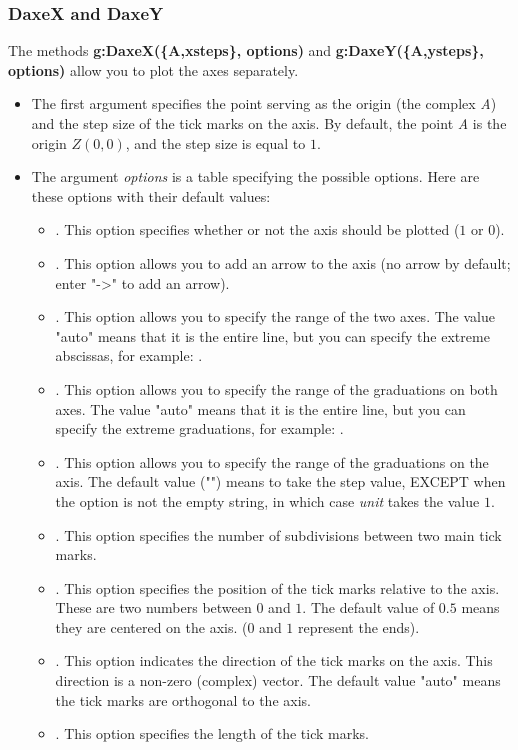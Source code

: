 \subsubsection{DaxeX and DaxeY}

The methods \textbf{g:DaxeX(\{A,xsteps\}, options)} and \textbf{g:DaxeY(\{A,ysteps\}, options)} allow you to plot the axes separately.
\begin{itemize}
    \item The first argument specifies the point serving as the origin (the complex \emph{A}) and the step size of the tick marks on the axis. By default, the point \emph{A} is the origin $Z(0,0)$, and the step size is equal to $1$.
    \item The argument \emph{options} is a table specifying the possible options. Here are these options with their default values:
\begin{itemize}
    \item {}. This option specifies whether or not the axis should be plotted ($1$ or $0$).
    \item {}. This option allows you to add an arrow to the axis (no arrow by default; enter "->" to add an arrow).
    \item {}. This option allows you to specify the range of the two axes. The value "auto" means that it is the entire line, but you can specify the extreme abscissas, for example: .
    \item {}. This option allows you to specify the range of the graduations on both axes. The value "auto" means that it is the entire line, but you can specify the extreme graduations, for example: .
    \item {}. This option allows you to specify the range of the graduations on the axis. The default value ("") means to take the step value, EXCEPT when the  option is not the empty string, in which case \emph{unit} takes the value $1$.
    \item {}. This option specifies the number of subdivisions between two main tick marks.
    \item {}. This option specifies the position of the tick marks relative to the axis. These are two numbers between $0$ and $1$. The default value of $0.5$ means they are centered on the axis. ($0$ and $1$ represent the ends).
    \item {}. This option indicates the direction of the tick marks on the axis. This direction is a non-zero (complex) vector. The default value "auto" means the tick marks are orthogonal to the axis.     \item {}. This option specifies the length of the tick marks.

\end{itemize}
\end{itemize}
